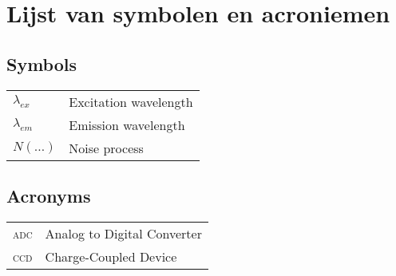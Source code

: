 \chapter*{Lijst van symbolen en acroniemen}

\section*{Symbols}


\begin{longtable}{ll}
$\lambda_{ex}$  &       Excitation wavelength\\
$\lambda_{em}$  &	Emission wavelength\\
$N(\ldots)$	&	Noise process\\
\end{longtable}


\section*{Acronyms}

\begin{longtable}{ll}
\textsc{adc}	& Analog to Digital Converter\\
\textsc{ccd}	& Charge-Coupled Device\\
\end{longtable}
